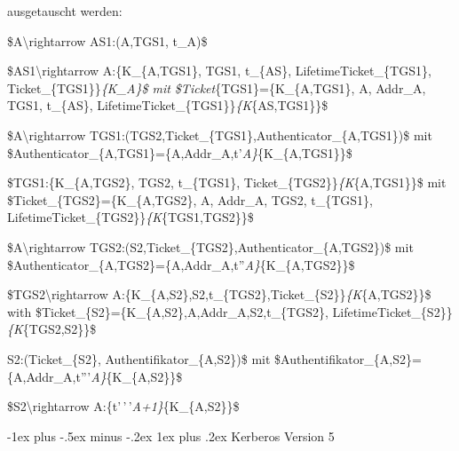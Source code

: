 \documentclass[a4paper]{article}
\makeatletter
\renewcommand{\subsubsection}{\@startsection{subsubsection}{3}{0mm}%
 {-1ex plus -.5ex minus -.2ex}%
 {1ex plus .2ex}%
 {\normalfont\small\bfseries}}
\makeatother
\begin{document}
\begin{multicols}{3}
\begin{itemize*}
            ausgetauscht werden:
            \begin{enumerate*}
                  \def\labelenumi{\arabic{enumi}.}
                  \item \$A\textbackslash rightarrow AS1:(A,TGS1, t\_A)\$
                  \item \$AS1\textbackslash rightarrow A:\{K\_\{A,TGS1\}, TGS1, t\_\{AS\}, LifetimeTicket\_\{TGS1\}, Ticket\_\{TGS1\}\}\emph{\{K\_A\}\$ mit \$Ticket}\{TGS1\}=\{K\_\{A,TGS1\}, A, Addr\_A, TGS1, t\_\{AS\}, LifetimeTicket\_\{TGS1\}\}\emph{\{K}\{AS,TGS1\}\}\$
                  \item \$A\textbackslash rightarrow TGS1:(TGS2,Ticket\_\{TGS1\},Authenticator\_\{A,TGS1\})\$ mit \$Authenticator\_\{A,TGS1\}=\{A,Addr\_A,t'\emph{A\}}\{K\_\{A,TGS1\}\}\$
                  \item \$TGS1:\{K\_\{A,TGS2\}, TGS2, t\_\{TGS1\}, Ticket\_\{TGS2\}\}\emph{\{K}\{A,TGS1\}\}\$ mit \$Ticket\_\{TGS2\}=\{K\_\{A,TGS2\}, A, Addr\_A, TGS2, t\_\{TGS1\}, LifetimeTicket\_\{TGS2\}\}\emph{\{K}\{TGS1,TGS2\}\}\$
                  \item \$A\textbackslash rightarrow TGS2:(S2,Ticket\_\{TGS2\},Authenticator\_\{A,TGS2\})\$ mit \$Authenticator\_\{A,TGS2\}=\{A,Addr\_A,t''\emph{A\}}\{K\_\{A,TGS2\}\}\$
                  \item \$TGS2\textbackslash rightarrow A:\{K\_\{A,S2\},S2,t\_\{TGS2\},Ticket\_\{S2\}\}\emph{\{K}\{A,TGS2\}\}\$ with \$Ticket\_\{S2\}=\{K\_\{A,S2\},A,Addr\_A,S2,t\_\{TGS2\}, LifetimeTicket\_\{S2\}\}\emph{\{K}\{TGS2,S2\}\}\$
                  \item S2:(Ticket\_\{S2\}, Authentifikator\_\{A,S2\})\$ mit \$Authentifikator\_\{A,S2\}=\{A,Addr\_A,t'''\emph{A\}}\{K\_\{A,S2\}\}\$
                  \item \$S2\textbackslash rightarrow A:\{t'\,'\,'\emph{A+1\}}\{K\_\{A,S2\}\}\$
            \end{enumerate*}
      \end{itemize*}


      \subsubsection{Kerberos Version 5}


\end{multicols}
\end{document}
